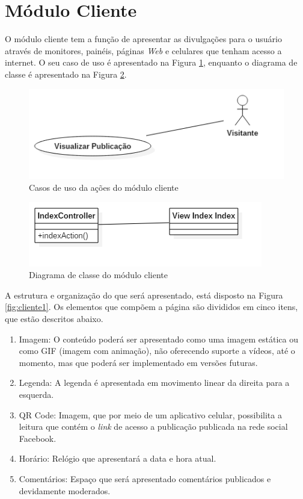 \section{Módulo Cliente}
\label{sec:cliente}
O módulo cliente tem a função de apresentar as divulgações para o usuário através de monitores, painéis, páginas \textit{Web} e celulares que tenham acesso a internet. O seu caso de uso é apresentado na Figura \ref{fig:casosDeUsoCliente}, enquanto o diagrama de classe é apresentado na Figura \ref{fig:diagramaclasseCLIENTE}.

\begin{figure}[H]
\centering
\includegraphics[scale=0.8]{figuras/CasosDeUsoCliente}
\caption{Casos de uso da ações do módulo cliente}
\label{fig:casosDeUsoCliente}
\end{figure} 

\begin{figure}[H]
\centering
\includegraphics[scale=0.7]{figuras/diagramaclasseCLIENTE}
\caption{Diagrama de classe do módulo cliente}
\label{fig:diagramaclasseCLIENTE}
\end{figure}

A estrutura e organização do que será apresentado, está disposto na Figura \ref{fig:cliente1}. Os elementos que compõem a página são divididos em cinco itens, que estão descritos abaixo.

\begin{enumerate}
   \item Imagem: O conteúdo poderá ser apresentado como uma imagem estática ou como GIF (imagem com animação), não oferecendo suporte a vídeos, até o momento, mas que poderá ser implementado em versões futuras. 
   \item Legenda: A legenda é apresentada em movimento linear da direita para a esquerda.
   \item QR Code: Imagem, que por meio de um aplicativo celular, possibilita a leitura que contém o \textit{link} de acesso a publicação publicada na rede social Facebook.
   \item Horário: Relógio que apresentará a data e hora atual.  
   \item Comentários: Espaço que será apresentado comentários publicados e devidamente moderados.
 \end{enumerate}
  
